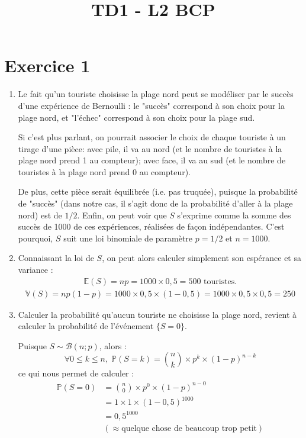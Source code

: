 \documentclass[a4paper,oneside,12pt]{article}
\title{TD1 - L2 BCP}
\author{}
\date{}
\theoremstyle{plain}
\def\V{\mathbb{V}}
\def\P{{\mathbb P}}
\def\E{{\mathbb E}}
\begin{document}
\maketitle

\section*{Exercice 1}



\begin{enumerate}
    \item Le fait qu'un touriste choisisse la plage nord peut se modéliser par le succès d'une expérience de Bernoulli : le "succès" correspond à son choix pour la plage nord, et "l'échec" correspond à son choix pour la plage sud.
    
    Si c'est plus parlant, on pourrait associer le choix de chaque touriste à un tirage d'une pièce: avec pile, il va au nord (et le nombre de touristes à la plage nord prend 1 au compteur); avec face, il va au sud (et le nombre de touristes à la plage nord prend 0 au compteur). 
    
    De plus, cette pièce serait équilibrée (i.e. pas truquée), puisque la probabilité de "succès" (dans notre cas, il s'agit donc de la probabilité d'aller à la plage nord) est de $1/2$. Enfin, on peut voir que $S$ s'exprime comme la somme des succès de 1000 de ces expériences, réalisées de façon indépendantes. C'est pourquoi, $S$ suit une loi binomiale de paramètre $p=1/2$ et $n=1000$.
    
    \item Connaissant la loi de $S$, on peut alors calculer simplement son espérance et sa variance :
    \begin{align*}
        \E(S) = np = 1000\times 0,5 = 500 \mbox{ touristes.}
    \end{align*}
    \begin{align*}
        \V(S) = np(1-p) = 1000\times 0,5\times (1-0,5) = 1000 \times 0,5 \times 0,5 = 250
    \end{align*}
    
     \item Calculer la probabilité qu'aucun touriste ne choisisse la plage nord,  revient à calculer la probabilité de l'événement $\{S = 0\}$. 
     
     Puisque $S \sim \mathcal{B}(n; p)$, alors :
     $$\forall 0\le k\le n,\; \P(S=k) = \binom{n}{k} \times p^k \times (1-p)^{n-k} $$
     ce qui nous permet de calculer :
     \begin{align*}
         \P(S = 0) &= \binom{n}{0}\times p^0\times (1-p)^{n-0} \\
         &= 1 \times 1 \times (1-0,5)^{1000}\\
         &=0,5^{1000}\\
         &(\approx \mbox{quelque chose de beaucoup trop petit})
     \end{align*}
    

\end{enumerate}
\end{document}
